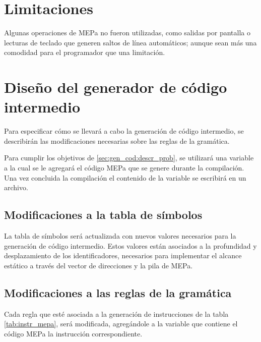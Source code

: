 \section{Limitaciones}
Algunas operaciones de MEPa no fueron utilizadas, como salidas por pantalla o lecturas de teclado que generen saltos de línea automáticos; aunque sean más una comodidad para el programador que una limitación. 

\section{Diseño del generador de código intermedio}
Para especificar cómo se llevará a cabo la generación de código intermedio, se describirán las modificaciones necesarias sobre las reglas de la gramática.

Para cumplir los objetivos de \ref{sec:gen_cod:descr_prob}, se utilizará una variable a la cual se le agregará el código MEPa que se genere durante la compilación. Una vez concluida la compilación el contenido de la variable se escribirá en un archivo.

\subsection{Modificaciones a la tabla de símbolos}
\label{sec:gen_cod:mod_tab_sim}
La tabla de símbolos será actualizada con nuevos valores necesarios para la generación de código intermedio. Estos valores están asociados a la profundidad y desplazamiento de los identificadores, necesarios para implementar el alcance estático a través del vector de direcciones y la pila de MEPa.

\subsection{Modificaciones a las reglas de la gramática}
Cada regla que esté asociada a la generación de instrucciones de la tabla \ref{tab:instr_mepa}, será modificada, agregándole a la variable que contiene el código MEPa la instrucción correspondiente.

